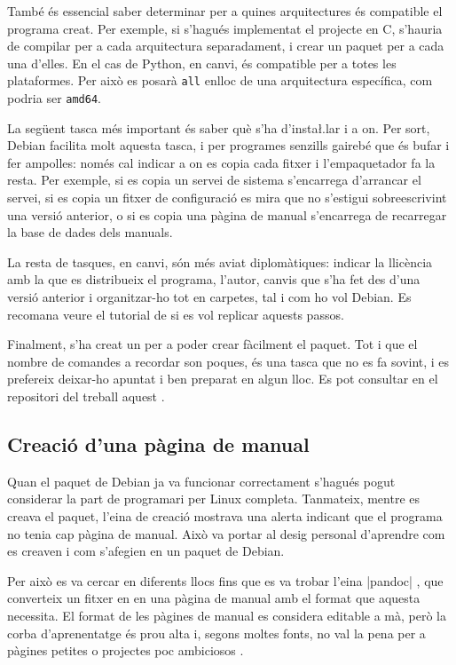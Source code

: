 També és essencial saber determinar per a quines arquitectures és compatible el
programa creat. Per exemple, si s'hagués implementat el projecte en C, s'hauria
de compilar per a cada arquitectura separadament, i crear un paquet per a cada
una d'elles. En el cas de Python, en canvi, és compatible per a totes les
plataformes. Per això es posarà \texttt{all} enlloc de una arquitectura específica,
com podria ser \texttt{amd64}.

La següent tasca més important és saber què s'ha d'insta\l.lar i a on. Per sort,
Debian facilita molt aquesta tasca, i per programes senzills gairebé que és
bufar i fer ampolles: només cal indicar a on es copia cada fitxer i l'empaquetador
fa la resta. Per exemple, si es copia un servei de sistema s'encarrega d'arrancar
el servei, si es copia un fitxer de configuració es mira que no s'estigui
sobreescrivint una versió anterior, o si es copia una pàgina de manual s'encarrega
de recarregar la base de dades dels manuals.

La resta de tasques, en canvi, són més aviat diplomàtiques: indicar la llicència
amb la que es distribueix el programa, l'autor, canvis que s'ha fet des d'una
versió anterior i organitzar-ho tot en carpetes, tal i com ho vol Debian.
Es recomana veure el tutorial de \cite{DebCreation} si es vol replicar aquests passos.

Finalment, s'ha creat un  per a poder crear fàcilment el
paquet. Tot i que el nombre de comandes a recordar son poques, és una tasca que
no es fa sovint, i es prefereix deixar-ho apuntat i ben preparat en algun lloc.
Es pot consultar en el repositori del treball aquest .

\subsection{Creació d'una pàgina de manual}

Quan el paquet de Debian ja va funcionar correctament s'hagués pogut considerar
la part de programari per Linux completa. Tanmateix, mentre es creava el paquet,
l'eina de creació mostrava una alerta indicant que el programa no tenia cap
pàgina de manual. Això va portar al desig personal d'aprendre com es creaven
i com s'afegien en un paquet de Debian.

Per això es va cercar en diferents llocs fins que es va trobar l'eina
\ord|pandoc| \cite{PandocTutorial},
que converteix un fitxer en  en una pàgina de manual amb el
format que aquesta necessita. El format de les pàgines de manual es considera
editable a mà, però la corba d'aprenentatge és prou alta i, segons moltes fonts,
no val la pena per a pàgines petites o projectes poc ambiciosos \cite{Manpage}.

